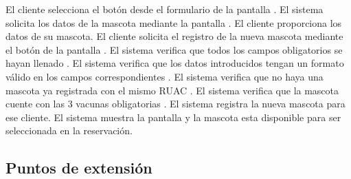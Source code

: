 \begin{UCtrayectoria}
	\UCpaso[] \label{UC3.paso1} El cliente selecciona  el botón  desde el formulario de la pantalla .
	\UCpaso [] \label{UC3.paso2} El sistema solicita los datos de la mascota mediante la pantalla  .
	\UCpaso [] \label{UC3.paso3} El cliente proporciona los datos de su mascota.
	 \UCpaso[] \label{UC3.paso4} El cliente solicita el registro de la nueva mascota mediante el botón  de la pantalla .
{}El sistema verifica que todos los campos obligatorios se hayan llenado .     El sistema verifica que los datos introducidos tengan un formato válido en los campos correspondientes .
\UCpaso[] \label{UC3.paso7} El sistema verifica que no haya una mascota ya registrada con el mismo RUAC .
\UCpaso[] \label{UC3.paso8} El sistema verifica que la mascota cuente con las 3 vacunas obligatorias .
\UCpaso[] \label{UC3.paso9} El sistema registra la nueva mascota para ese cliente.
\UCpaso[] \label{UC3.paso10} El sistema muestra la pantalla  y la mascota esta disponible para ser seleccionada en la reservación.
	
\end{UCtrayectoria}




\subsection{Puntos de extensión}



